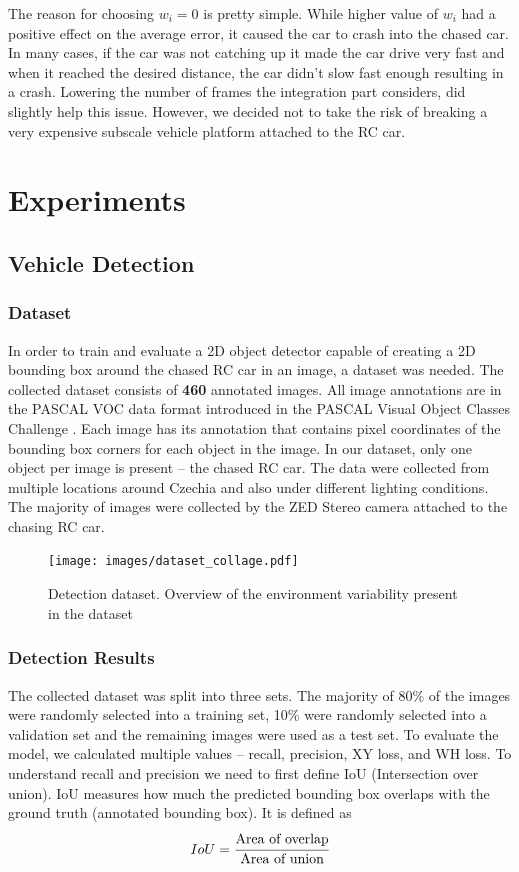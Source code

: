 \documentclass{ctuthesis/ctuthesis}
\begin{document}
The reason for choosing $w_i=0$ is pretty simple. While higher value of $w_i$ had a positive effect on the average error, it caused the car to crash into the chased car. In many cases, if the car was not catching up it made the car drive very fast and when it reached the desired distance, the car didn't slow fast enough resulting in a crash. Lowering the number of frames the integration part considers, did slightly help this issue. However, we decided not to take the risk of breaking a very expensive subscale vehicle platform attached to the RC car.



\chapter{Experiments}

\section{Vehicle Detection}
\subsection{Dataset} \label{s:detection_dataset}
In order to train and evaluate a 2D object detector capable of creating a 2D bounding box around the chased RC car in an image, a dataset was needed. The collected dataset consists of \textbf{460} annotated images. All image annotations are in the PASCAL VOC data format introduced in the PASCAL Visual Object Classes Challenge \cite{pascal-voc}. Each image has its annotation that contains pixel coordinates of the bounding box corners for each object in the image. In our dataset, only one object per image is present -- the chased RC car. The data were collected from multiple locations around Czechia and also under different lighting conditions. The majority of images were collected by the ZED Stereo camera attached to the chasing RC car. 

\begin{figure}[h!]
    \centering
    \texttt{[image: images/dataset\_collage.pdf]}
    
    \caption{Detection dataset. Overview of the environment variability present in the dataset}\label{f:dataset_detection}
\end{figure}


\subsection{Detection Results}
The collected dataset was split into three sets. The majority of 80\% of the images were randomly selected into a training set, 10\% were randomly selected into a validation set and the remaining images were used as a test set. To evaluate the model, we calculated multiple values -- recall, precision, XY loss, and WH loss. To understand recall and precision we need to first define IoU (Intersection over union). IoU measures how much the predicted bounding box overlaps with the ground truth (annotated bounding box). It is defined as 
\begin{equation}IoU = \cfrac{\textrm{Area of overlap}}{\textrm{Area of union}}\end{equation}
\end{document}

